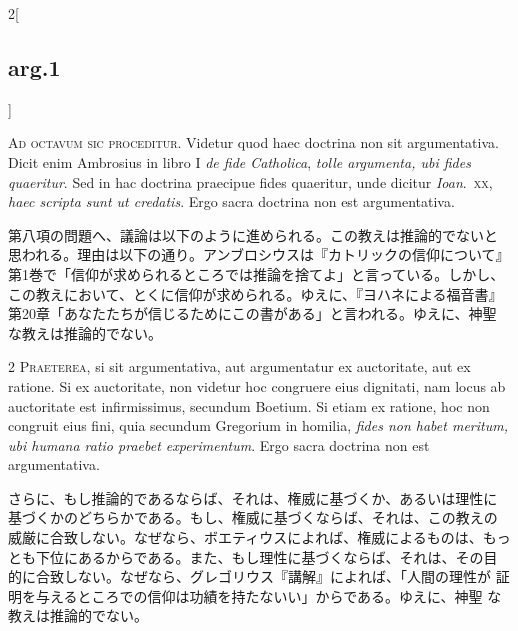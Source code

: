 \documentclass[
paper=a4paper,
fontsize=10pt,
jafontsize=9pt,
titlepage
]{jlreq}
\begin{document}
\begin{paracol}{2}[\subsection{arg.1}]

{\Huge A}{\scshape d octavum sic proceditur}. Videtur quod haec
doctrina non sit argumentativa. Dicit enim Ambrosius in libro I
{\itshape de fide Catholica}, {\itshape tolle argumenta, ubi fides
quaeritur}. Sed in hac doctrina praecipue fides quaeritur, unde
dicitur {\itshape Ioan}.~{\scshape xx}, {\itshape haec scripta sunt ut
credatis}. Ergo sacra doctrina non est argumentativa.

\switchcolumn

第八項の問題へ、議論は以下のように進められる。この教えは推論的でないと
思われる。理由は以下の通り。アンブロシウスは『カトリックの信仰について』
第1巻で「信仰が求められるところでは推論を捨てよ」と言っている。しかし、
この教えにおいて、とくに信仰が求められる。ゆえに、『ヨハネによる福音書』
第20章「あなたたちが信じるためにこの書がある」と言われる。ゆえに、神聖
な教えは推論的でない。



{\scshape 2 Praeterea}, si sit argumentativa, aut argumentatur ex
auctoritate, aut ex ratione. Si ex auctoritate, non videtur hoc
congruere eius dignitati, nam locus ab auctoritate est infirmissimus,
secundum Boetium. Si etiam ex ratione, hoc non congruit eius fini,
quia secundum Gregorium in homilia, {\itshape fides non habet meritum,
ubi humana ratio praebet experimentum}. Ergo sacra doctrina non est
argumentativa.

\switchcolumn

さらに、もし推論的であるならば、それは、権威に基づくか、あるいは理性に
基づくかのどちらかである。もし、権威に基づくならば、それは、この教えの
威厳に合致しない。なぜなら、ボエティウスによれば、権威によるものは、もっ
とも下位にあるからである。また、もし理性に基づくならば、それは、その目
的に合致しない。なぜなら、グレゴリウス『講解』によれば、「人間の理性が
証明を与えるところでの信仰は功績を持たないい」からである。ゆえに、神聖
な教えは推論的でない。

\switchcolumn*[\subsection{s.c.}]


\end{paracol}
\end{document}
